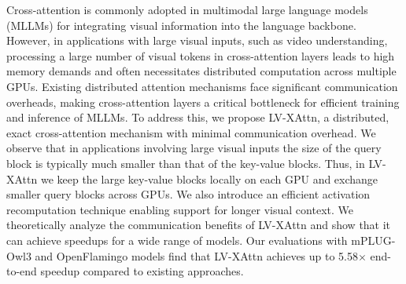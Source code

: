 Cross-attention is commonly adopted in multimodal large language models (MLLMs) for integrating visual information into the language backbone. However, in applications with large visual inputs, such as video understanding, processing a large number of visual tokens in cross-attention layers leads to high memory demands and often necessitates distributed computation across multiple GPUs. Existing distributed attention mechanisms face significant communication overheads, making cross-attention layers a critical bottleneck for efficient training and inference of MLLMs. To address this, we propose LV-XAttn, a distributed, exact cross-attention mechanism with minimal communication overhead. We observe that in applications involving large visual inputs the size of the query block is typically much smaller than that of the key-value blocks.  Thus, in LV-XAttn we keep the large key-value blocks locally on each GPU and exchange smaller query blocks across GPUs. We also introduce an efficient activation recomputation technique enabling support for longer visual context. We theoretically analyze the communication benefits of LV-XAttn and show that it can achieve speedups for a wide range of models. Our evaluations with mPLUG-Owl3 and OpenFlamingo models find that LV-XAttn achieves up to 5.58$\times$ end-to-end speedup compared to existing approaches.